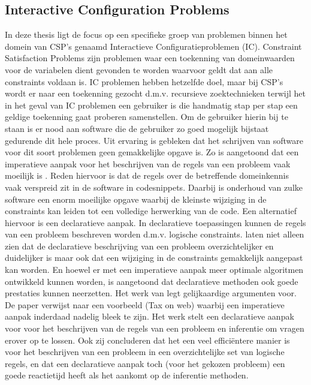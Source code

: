 \subsection{Interactive Configuration Problems}
In deze thesis ligt de focus op een specifieke groep van problemen binnen het domein van CSP's genaamd Interactieve Configuratieproblemen (IC). Constraint Satisfaction Problems zijn problemen waar een toekenning van domeinwaarden voor de variabelen dient gevonden te worden waarvoor geldt dat aan alle constraints voldaan is. IC problemen hebben hetzelfde doel, maar bij CSP's wordt er naar een toekenning gezocht d.m.v. recursieve zoektechnieken terwijl het in het geval van IC problemen een gebruiker is die handmatig stap per stap een geldige toekenning gaat proberen samenstellen. Om de gebruiker hierin bij te staan is er nood aan software die de gebruiker zo goed mogelijk bijstaat gedurende dit hele proces. Uit ervaring is gebleken dat het schrijven van software voor dit soort problemen geen gemakkelijke opgave is. Zo is aangetoond dat een imperatieve aanpak voor het beschrijven van de regels van een probleem vaak moeilijk is \citep{gelle1996interactive}. Reden hiervoor is dat de regels over de betreffende domeinkennis vaak verspreid zit in de software in codesnippets. Daarbij is onderhoud van zulke software een enorm moeilijke opgave waarbij de kleinste wijziging in de constraints kan leiden tot een volledige herwerking van de code. Een alternatief hiervoor is een declaratieve aanpak. In declaratieve toepassingen kunnen de regels van een probleem beschreven worden d.m.v. logische constraints. \cite{gelle1996interactive} laten niet alleen zien dat de declaratieve beschrijving van een probleem overzichtelijker en duidelijker is maar ook dat een wijziging in de constraints gemakkelijk aangepast kan worden. En hoewel er met een imperatieve aanpak meer optimale algoritmen ontwikkeld kunnen worden, is aangetoond dat declaratieve methoden ook goede prestaties kunnen neerzetten. Het werk van\citep{vlaeminck2009logical} legt gelijkaardige argumenten voor. De paper verwijst naar een voorbeeld (Tax on web) waarbij een imperatieve aanpak inderdaad nadelig bleek te zijn. Het werk stelt een declaratieve aanpak voor voor het beschrijven van de regels van een probleem en inferentie om vragen erover op te lossen. Ook zij concluderen dat het een veel effici\"{e}ntere manier is voor het beschrijven van een probleem in een overzichtelijke set van logische regels, en dat een declaratieve aanpak toch (voor het gekozen probleem) een goede reactietijd heeft als het aankomt op de inferentie methoden.

